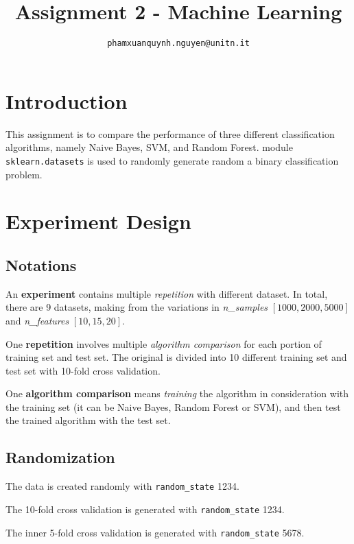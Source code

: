 \documentclass[conference]{IEEEtran}
\begin{document}
\title{Assignment 2 - Machine Learning}

\author{
	\texttt{phamxuanquynh.nguyen@unitn.it}
}

\maketitle

\acresetall

\section{Introduction}
\label{sec:introduction}
This assignment is to compare the performance of three different classification algorithms, namely Naive Bayes, SVM, and Random Forest. module \texttt{sklearn.datasets} is used to randomly generate random a binary classification problem.

\section{Experiment Design}
\subsection{Notations}
An \textbf{experiment} contains multiple \textit{repetition} with different dataset. In total, there are 9 datasets, making from the variations in \textit{n\_samples} $[1000, 2000, 5000]$ and \textit{n\_features} $[10, 15, 20]$.

One \textbf{repetition} involves multiple \textit{algorithm comparison} for each portion of training set and test set. The original is divided into 10 different training set and test set with 10-fold cross validation.

One \textbf{algorithm comparison} means \textit{training} the algorithm in consideration with the training set (it can be Naive Bayes, Random Forest or SVM), and then test the trained algorithm with the test set.

\subsection{Randomization}
The data is created randomly with \texttt{random\_state} 1234.

The 10-fold cross validation is generated with \texttt{random\_state} 1234.

The inner 5-fold cross validation is generated with \texttt{random\_state} 5678.
\end{document}
